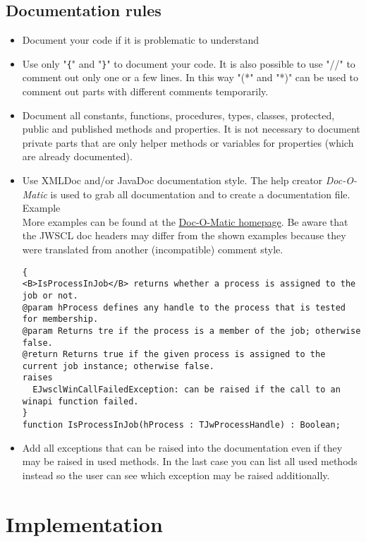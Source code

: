 \documentclass[a4paper,oneside,10pt]{article}
\begin{document}
\subsection{Documentation rules}
\begin{itemize}
	\item Document your code if it is problematic to understand
	\item Use only "\verb#{#" and "\verb#}#" to document your code. It is also possible to use "//" to comment out only one or a few lines. In this way "(*" and "*)" can be used to comment out parts with different comments temporarily.
	\item Document all constants, functions, procedures, types, classes, protected, public and published methods and properties. It is not necessary to document private parts that are only helper methods or variables for properties (which are already documented).
	\item Use XMLDoc and/or JavaDoc documentation style. The help creator \textit{Doc-O-Matic} is used to grab all documentation and to create a documentation file.
Example\\ 
More examples can be found at the \href{http://www.doc-o-matic.com/examplesourcecode.html}{Doc-O-Matic homepage}.
Be aware that the JWSCL doc headers may differ from the shown examples because they were translated from another (incompatible) comment style.
\begin{lstlisting}  
{
<B>IsProcessInJob</B> returns whether a process is assigned to the job or not.
@param hProcess defines any handle to the process that is tested for membership.
@param Returns tre if the process is a member of the job; otherwise false.
@return Returns true if the given process is assigned to the current job instance; otherwise false.
raises
  EJwsclWinCallFailedException: can be raised if the call to an winapi function failed.
}
function IsProcessInJob(hProcess : TJwProcessHandle) : Boolean;
\end{lstlisting}

\item Add all exceptions that can be raised into the documentation even if they may be raised in used methods. In the last case you can list all used methods instead so the user can see which exception may be raised additionally.

\end{itemize}

\section{Implementation}
\end{document}
